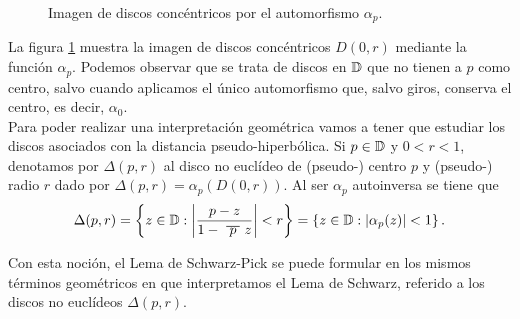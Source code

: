 \begin{figure}[h]{}
    \begin{minipage}[h]{0.5\textwidth}
        \centering
        \label{fig:circulos1}
    \end{minipage} \hfill
     \begin{minipage}[h]{0.5\textwidth}
        \centering
        \label{fig:circulos2}
    \end{minipage}
    \caption{Imagen de discos concéntricos por el automorfismo $\alpha_p$.}
    \label{fig:automorfismo}
\end{figure}

La figura \ref{fig:automorfismo} muestra la imagen de discos concéntricos $D(0,r)$ mediante la función $\alpha_p$. Podemos observar que se trata de discos en $\mathbb{D}$ que no tienen a $p$ como centro, salvo cuando aplicamos el único automorfismo que, salvo giros, conserva el centro, es decir, $\alpha_0$. \\

Para poder realizar una interpretación geométrica vamos a tener que estudiar los discos asociados con la distancia pseudo-hiperbólica. Si $p \in \mathbb{D}$ y $0 < r < 1$, denotamos por $\Delta(p,r)$ al disco no euclídeo de (pseudo-) centro $p$ y (pseudo-) radio $r$ dado por $\Delta(p,r) = \alpha_p(D(0,r))$. Al ser $\alpha_p$ autoinversa se tiene que
\begin{equation*}
    \Delta(p,r) = \left\{z \in \disk: \abs{\frac{p-z}{1 - \xbar{p}z}} < r\right\} = \left\{z \in \disk: \abs{\alpha_p(z)} < 1\right\}.
\end{equation*}

Con esta noción, el Lema de Schwarz-Pick se puede formular en los mismos términos geométricos en que interpretamos el Lema de Schwarz, referido a los discos no euclídeos $\Delta(p,r)$. \\

